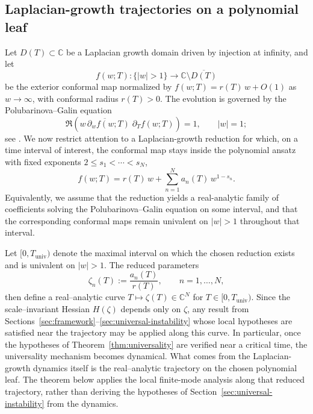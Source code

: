 \documentclass[11pt]{amsart}
\numberwithin{equation}{section}
\theoremstyle{plain}
\theoremstyle{definition}
\theoremstyle{remark}
\newcommand{\CC}{\mathbb{C}}
\begin{document}
\subsection{Laplacian-growth trajectories on a polynomial leaf}
\label{subsec:lg-trajectories}

Let $D(T)\subset\CC$ be a Laplacian growth domain driven by injection at
infinity, and let
\[
	f(w;T)\colon \{|w|>1\}\to \CC\setminus\overline{D(T)}
\]
be the exterior conformal map normalized by $f(w;T)=r(T)\,w+O(1)$ as
$w\to\infty$, with conformal radius $r(T)>0$.
The evolution is governed by the Polubarinova--Galin equation
\begin{equation}\label{eq:PG}
	\Re\!\left(
	\overline{w\,\partial_w f(w;T)}\;
	\partial_T f(w;T)\right)=1,
	\qquad |w|=1;
\end{equation}
see \cite{Galin1945,PolubarinovaKochina1945}.
We now restrict attention to a Laplacian-growth reduction for which, on a
time interval of interest, the conformal map stays inside the polynomial ansatz
with fixed exponents $2\le s_1<\cdots<s_N$,
\begin{equation}\label{eq:poly-submanifold-lg}
	f(w;T)=r(T)\,w+\sum_{n=1}^{N}a_n(T)\,w^{1-s_n}.
\end{equation}
Equivalently, we assume that the reduction yields a real-analytic family of coefficients solving the Polubarinova--Galin equation on some interval,
and that the corresponding conformal maps remain univalent on $|w|>1$ throughout that interval.

Let $[0,T_{\mathrm{univ}})$ denote the maximal interval on which the chosen
reduction exists and is univalent on $|w|>1$. The reduced parameters
\[
	\zeta_n(T):=\frac{a_n(T)}{r(T)},\qquad n=1,\dots,N,
\]
then define a real--analytic curve $T\mapsto\zeta(T)\in\CC^N$ for
$T\in[0,T_{\mathrm{univ}})$. Since the scale--invariant Hessian $H(\zeta)$
depends only on $\zeta$, any result from
Sections~\ref{sec:framework}--\ref{sec:universal-instability} whose local
hypotheses are satisfied near the trajectory may be applied along this curve.
In particular, once the hypotheses of Theorem~\ref{thm:universality} are
verified near a critical time, the universality mechanism becomes dynamical.
What comes from the Laplacian-growth dynamics itself is the real--analytic
trajectory on the chosen polynomial leaf. The theorem below applies the local finite-mode analysis along that reduced trajectory, rather than deriving the hypotheses of Section~\ref{sec:universal-instability} from the dynamics.
\end{document}
